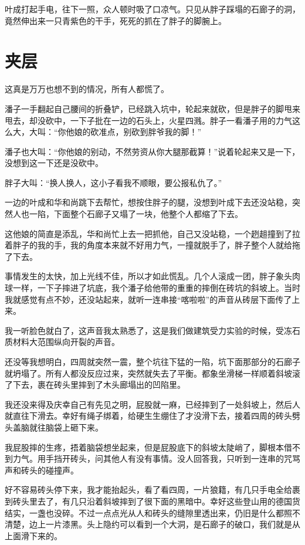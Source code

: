 叶成打起手电，往下一照，众人顿时吸了口凉气。只见从胖子踩塌的石廊子的洞，竟然伸出来一只青紫色的干手，死死的抓在了胖子的脚腕上。

\chapter{夹层}

这真是万万也想不到的情况，所有人都慌了。

潘子一手翻起自己腰间的折叠铲，已经跳入坑中，轮起来就砍，但是胖子的脚甩来甩去，却没砍中，一下子批在一边的石头上，火星四溅。胖子一看潘子用的力气这么大，大叫：“你他娘的砍准点，别砍到胖爷我的脚！”

潘子也大叫：“你他娘的别动，不然劳资从你大腿那截算！”说着轮起来又是一下，没想到这一下还是没砍中。

胖子大叫：“换人换人，这小子看我不顺眼，要公报私仇了。”

一边的叶成和华和尚跳下去帮忙，想按住胖子的腿，没想到叶成下去还没站稳，突然人也一陷，下面整个石廊子又塌了一块，他整个人都缩了下去。

这他娘的简直是添乱，华和尚忙上去一把抓他，自己又没站稳，一个趔趄撞到了拉着胖子的我的手，我的角度本来就不好用力气，一撞就脱手了，胖子整个人就给拖了下去。

事情发生的太快，加上光线不佳，所以才如此慌乱。几个人滚成一团，胖子象头肉球一样，一下子摔进了坑底，我个潘子给他带的重重的摔倒在砖坑的斜坡上。当时我就感觉有点不妙，还没站起来，就听一连串接“喀啦啦”的声音从砖层下面传了上来。

我一听脸色就白了，这声音我太熟悉了，这是我们做建筑受力实验的时候，受冻石质材料大范围纵向开裂的声音。

还没等我想明白，四周就突然一震，整个坑往下猛的一陷，坑下面那部分的石廊子就坍塌了。所有人都没反应过来，突然就失去了平衡。都象坐滑梯一样顺着斜坡滚了下去，裹在砖头里摔到了木头廊塌出的凹陷里。

我还没来得及庆幸自己有先见之明，屁股就一麻，已经摔到了一处斜坡上，然后人就直往下滑去。幸好有绳子绑着，给硬生生绷住了才没滑下去，接着四周的砖头劈头盖脑就往脑袋上砸下来。

我屁股摔的生疼，捂着脑袋想坐起来，但是屁股底下的斜坡太陡峭了，脚根本借不到力气。用手挡开砖头，问其他人有没有事情。没人回答我，只听到一连串的咒骂声和砖头的碰撞声。

好不容易砖头停下来，我才能抬起头，看了看四周，一片狼籍，有几只手电全给裹到砖头里去了，有几只沿着斜坡摔到了很下面的黑暗中。幸好这些登山用的德国货结实，一盏也没碎。不过一点点光从人和砖头的缝隙里透出来，仍旧是什么都照不清楚，边上一片漆黑。头上隐约可以看到一个大洞，是石廊子的破口，我们就是从上面滑下来的。

